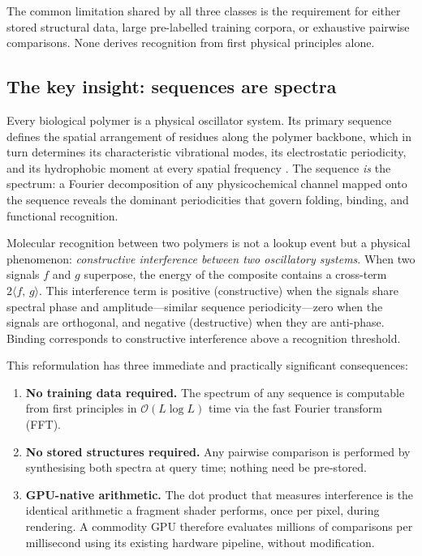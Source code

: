 \documentclass[twocolumn,11pt,a4paper]{article}
\theoremstyle{definition}
\theoremstyle{remark}
\newcommand{\innerprod}[2]{\langle #1,\, #2 \rangle}
\begin{document}
The common limitation shared by all three classes is the requirement for either
stored structural data, large pre-labelled training corpora, or exhaustive
pairwise comparisons. None derives recognition from first physical principles
alone.

\subsection{The key insight: sequences are spectra}

Every biological polymer is a physical oscillator system. Its primary sequence
defines the spatial arrangement of residues along the polymer backbone, which
in turn determines its characteristic vibrational modes, its electrostatic
periodicity, and its hydrophobic moment at every spatial frequency
\citep{voss1992,anastassiou2001,trifonov1980}. The sequence \emph{is} the
spectrum: a Fourier decomposition of any physicochemical channel mapped onto
the sequence reveals the dominant periodicities that govern folding, binding,
and functional recognition.

Molecular recognition between two polymers is not a lookup event but a
physical phenomenon: \emph{constructive interference between two oscillatory
systems}. When two signals $f$ and $g$ superpose, the energy of the composite
contains a cross-term $2\innerprod{f}{g}$. This interference term is positive
(constructive) when the signals share spectral phase and amplitude---similar
sequence periodicity---zero when the signals are orthogonal, and negative
(destructive) when they are anti-phase. Binding corresponds to constructive
interference above a recognition threshold.

This reformulation has three immediate and practically significant consequences:
\begin{enumerate}
  \item \textbf{No training data required.} The spectrum of any sequence is
    computable from first principles in $\mathcal{O}(L\log L)$ time via the
    fast Fourier transform (FFT).
  \item \textbf{No stored structures required.} Any pairwise comparison is
    performed by synthesising both spectra at query time; nothing need be
    pre-stored.
  \item \textbf{GPU-native arithmetic.} The dot product that measures
    interference is the identical arithmetic a fragment shader performs, once
    per pixel, during rendering. A commodity GPU therefore evaluates millions
    of comparisons per millisecond using its existing hardware pipeline, without
    modification.
\end{enumerate}
\end{document}
